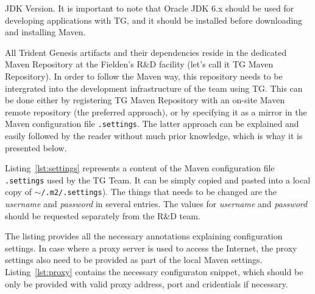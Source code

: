   \begin{notebox}{JDK Version.}{\label{mb:java}}
    It is important to note that Oracle JDK 6.x should be used for developing applications with TG, and it should be installed before downloading and installing Maven. 
  \end{notebox}
  
  All Trident Genesis artifacts and their dependencies reside in the dedicated Maven Repository at the Fielden's R\&D facility (let's call it TG Maven Repository).
  In order to follow the Maven way, this repository needs to be intergrated into the development infrastructure of the team using TG.
  This can be done either by registering TG Maven Repository with an on-site Maven remote repository (the preferred approach), or by specifying it as a mirror in the Maven configuration file \texttt{.settings}.
  The latter approach can be explained and easily followed by the reader without much prior knowledge, which is whay it is presented below.
  
  Listing~\ref{lst:settings} represents a content of the Maven configuration file \texttt{.settings} used by the TG Team.
  It can be simply copied and pasted into a local copy of \texttt{$\sim$/.m2/.settings}).
  The things that needs to be changed are the \emph{username} and \emph{password} in several entries.
  The values for \emph{username} and \emph{password}  should be requested separately from the R\&D team.

  The listing provides all the necessary annotations explaining configuration settings.
  In case where a proxy server is used to access the Internet, the proxy settings also need to be provided as part of the local Maven settings.
  Listing~\ref{lst:proxy} contains the necessary configuraton snippet, which should be only be provided with valid proxy address, port and cridentials if necessary.

